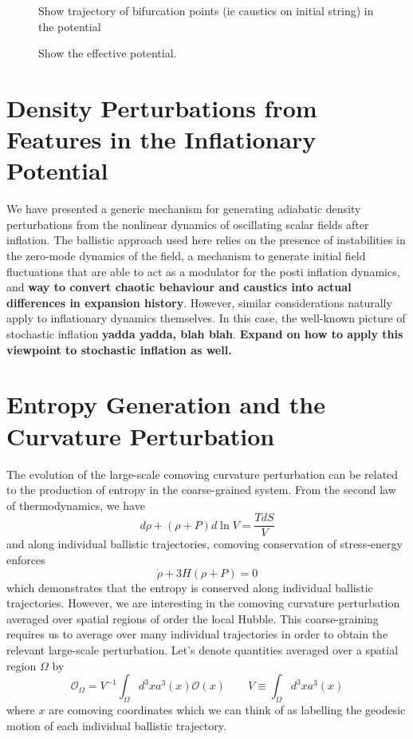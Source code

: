 \documentclass[11pt,a4paper]{article}
\begin{document}
\begin{figure}
  \caption{Show trajectory of bifurcation points (ie caustics on initial string) in the potential}
\end{figure}

\begin{figure}
  \caption{Show the effective potential.}
\end{figure}

\section{Density Perturbations from Features in the Inflationary Potential}
We have presented a generic mechanism for generating adiabatic density perturbations from the nonlinear dynamics of oscillating scalar fields after inflation.
The ballistic approach used here relies on the presence of instabilities in the zero-mode dynamics of the field,
a mechanism to generate initial field fluctuations that are able to act as a modulator for the posti inflation dynamics,
and {\bf way to convert chaotic behaviour and caustics into actual differences in expansion history}.
However, similar considerations naturally apply to inflationary dynamics themselves.
In this case, the well-known picture of stochastic inflation {\bf yadda yadda, blah blah}.
{\bf Expand on how to apply this viewpoint to stochastic inflation as well.}



\section{Entropy Generation and the Curvature Perturbation}
The evolution of the large-scale comoving curvature perturbation can be related to the production of entropy in the coarse-grained system.
From the second law of thermodynamics, we have
\begin{equation}
  d\rho + (\rho+P)d\ln V = \frac{TdS}{V}
\end{equation}
and along individual ballistic trajectories, comoving conservation of stress-energy enforces
\begin{equation}
  \dot{\rho} + 3H(\rho+P) = 0
\end{equation}
which demonstrates that the entropy is conserved along individual ballistic trajectories.
However, we are interesting in the comoving curvature perturbation averaged over spatial regions of order the local Hubble.
This coarse-graining requires us to average over many individual trajectories in order to obtain the relevant large-scale perturbation.
Let's denote quantities averaged over a spatial region $\Omega$ by
\begin{equation}
  \mathcal{O}_\Omega = V^{-1}\int_\Omega d^3x a^3(x)\mathcal{O}(x) \qquad V \equiv \int_\Omega d^3x a^3(x)
\end{equation}
where $x$ are comoving coordinates which we can think of as labelling the geodesic motion of each individual ballistic trajectory.
\end{document}
